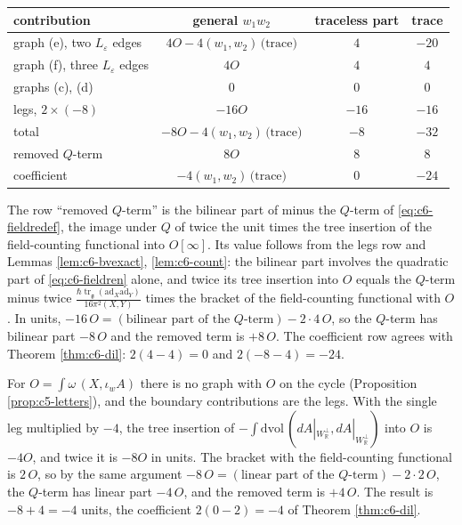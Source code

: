 \begin{example}
\begin{tabular}{l|c|c|c}
contribution & general $w_1w_2$ & traceless part & trace \\
\hline
graph (e), two $L_\varepsilon$ edges & $4O-4(w_1,w_2)\,\text{(trace)}$ & $4$ & $-20$ \\
graph (f), three $L_\varepsilon$ edges & $4O$ & $4$ & $4$ \\
graphs (c), (d) & $0$ & $0$ & $0$ \\
legs, $2\times(-8)$ & $-16O$ & $-16$ & $-16$ \\
\hline
total & $-8O-4(w_1,w_2)\,\text{(trace)}$ & $-8$ & $-32$ \\
removed $Q$-term & $8O$ & $8$ & $8$ \\
\hline
coefficient & $-4(w_1,w_2)\,\text{(trace)}$ & $0$ & $-24$ \\
\end{tabular}

The row ``removed $Q$-term'' is the bilinear part of minus the $Q$-term of \eqref{eq:c6-fieldredef}, the image under $Q$ of twice the unit times the tree insertion of the field-counting functional into $O[\infty]$. Its value follows from the legs row and Lemmas \ref{lem:c6-bvexact}, \ref{lem:c6-count}: the bilinear part involves the quadratic part of \eqref{eq:c6-fieldren} alone, and twice its tree insertion into $O$ equals the $Q$-term minus twice $\frac{\hbar\operatorname{tr}_{\mathfrak g}(\mathrm{ad}_X\mathrm{ad}_Y)}{16\pi^2(X,Y)}$ times the bracket of the field-counting functional with $O$. In units, $-16\,O=(\text{bilinear part of the }Q\text{-term})-2\cdot4\,O$, so the $Q$-term has bilinear part $-8\,O$ and the removed term is $+8\,O$. The coefficient row agrees with Theorem \ref{thm:c6-dil}: $2(4-4)=0$ and $2(-8-4)=-24$.
\end{example}

\begin{example}
\label{ex:c6-letter}
For $O=\int\omega\,(X,\iota_wA)$ there is no graph with $O$ on the cycle (Proposition \ref{prop:c5-letters}), and the boundary contributions are the legs. With the single leg multiplied by $-4$, the tree insertion of $-\int\mathrm{dvol}\,(dA|_{W_{\mathbb R}^\perp},dA|_{W_{\mathbb R}^\perp})$ into $O$ is $-4O$, and twice it is $-8O$ in units. The bracket with the field-counting functional is $2\,O$, so by the same argument $-8\,O=(\text{linear part of the }Q\text{-term})-2\cdot2\,O$, the $Q$-term has linear part $-4\,O$, and the removed term is $+4\,O$. The result is $-8+4=-4$ units, the coefficient $2(0-2)=-4$ of Theorem \ref{thm:c6-dil}.
\end{example}

